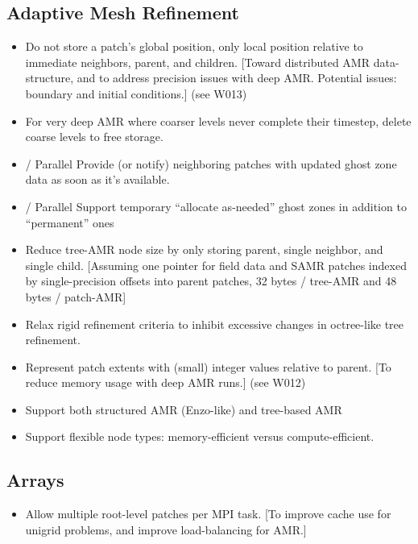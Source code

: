 \documentclass{article}
\begin{document}
\subsection{Adaptive Mesh Refinement}
\begin{itemize}
 \item Do not store a patch's global position, only local position relative to immediate neighbors, parent, and children. [Toward distributed AMR data-structure, and to address precision issues with deep AMR. Potential issues: boundary and initial conditions.] (see W013)
 \item For very deep AMR where coarser levels never complete their timestep, delete coarse levels to free storage.
 \item / Parallel Provide (or notify) neighboring patches with updated ghost zone data as soon as it's available.
 \item / Parallel Support temporary ``allocate as-needed'' ghost zones in addition to ``permanent'' ones
 \item Reduce tree-AMR node size by only storing parent, single neighbor, and single child. [Assuming one pointer for field data and SAMR patches indexed by single-precision offsets into parent patches, 32 bytes / tree-AMR and 48 bytes / patch-AMR]
 \item Relax rigid refinement criteria to inhibit excessive changes in octree-like tree refinement.
 \item Represent patch extents with (small) integer values relative to parent. [To reduce memory usage with deep AMR runs.] (see W012)
 \item Support both structured AMR (Enzo-like) and tree-based AMR
 \item Support flexible node types: memory-efficient versus compute-efficient.
\end{itemize}

\subsection{Arrays}

\begin{itemize}
 \item Allow multiple root-level patches per MPI task. [To improve cache use for unigrid problems, and improve load-balancing for AMR.]
\end{itemize}
\end{document}
